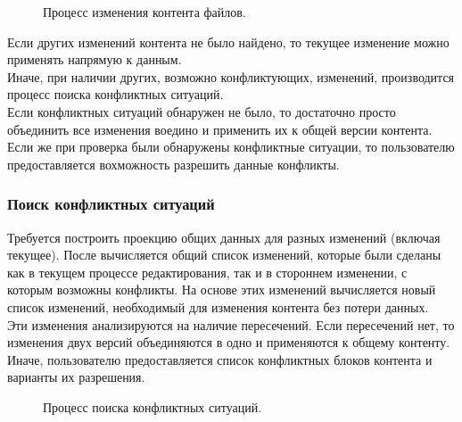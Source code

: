 \documentclass[a4paper,14pt]{extreport} %
\begin{document}
\begin{figure}[H]
\caption{Процесс изменения контента файлов.}
\label{update-file-content-process}
\end{figure}

Если других изменений контента не было найдено, то текущее изменение можно применять напрямую к данным. \\
Иначе, при наличии других, возможно конфликтующих, изменений, производится процесс поиска конфликтных ситуаций. \\
Если конфликтных ситуаций обнаружен не было, то достаточно просто объединить все изменения воедино и применить их к общей версии контента. \\
Если же при проверка были обнаружены конфликтные ситуации, то пользователю предоставляется вохможность разрешить данные конфликты.

\newpage
\subsubsection{Поиск конфликтных ситуаций}

Требуется построить проекцию общих данных для разных изменений (включая текущее). После вычисляется общий список изменений, которые были сделаны как в текущем процессе редактирования, так и в стороннем изменении, с которым возможны конфликты. На основе этих изменений вычисляется новый список изменений, необходимый для изменения контента без потери данных. \\
Эти изменения анализируются на наличие пересечений. Если пересечений нет, то изменения двух версий объединяются в одно и применяются к общему контенту. Иначе, пользователю предоставляется список конфликтных блоков контента и варианты их разрешения.

\begin{figure}[H]
\caption{Процесс поиска конфликтных ситуаций.}
\label{check-conflicts-process}
\end{figure}
\end{document}
